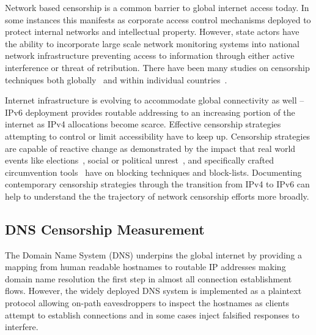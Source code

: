 Network based censorship is a common barrier to global internet access today.
In some instances this manifests as corporate access control mechanisms deployed
to protect internal networks and intellectual property. However,
state actors have the ability to incorporate large scale network monitoring
systems into national network infrastructure preventing access to information
through either active interference or threat of retribution. There
have been many studies on censorship techniques both
globally~\cite{pearce2017global,niaki2020iclab,scott2016satellite,sundara2020censored,filasto2012ooni,pearce2017augur}
and within individual countries~\cite{USESEC21:GFWatch,aryan2013internet,ramesh2020decentralized,yadav2018light,gebhart2017internet,nabi2013anatomy}.

Internet infrastructure is evolving to accommodate global connectivity as well
-- IPv6 deployment provides routable addressing to an increasing portion of the
internet as IPv4 allocations become scarce. Effective censorship strategies
attempting to control or limit accessibility have to keep up.
Censorship strategies are capable of reactive change as demonstrated by
the impact that real world events like elections~\cite{aryan2013internet},
social or political unrest~\cite{shandler2018measuring,padmanabhan2021multi},
and specifically crafted circumvention tools~\cite{beznazwy2020china}
have on blocking techniques and block-lists. Documenting contemporary censorship
strategies through the transition from IPv4 to IPv6 can help to understand the
the trajectory of network censorship efforts more broadly.


\subsection{DNS Censorship Measurement}

\FigDNSCensorship

The Domain Name System (DNS) underpins the global internet by providing a
mapping from human readable hostnames to routable IP addresses making domain name
resolution the first step in almost all connection establishment flows. However,
the widely deployed DNS system is implemented as a plaintext protocol allowing
on-path eavesdroppers to inspect the hostnames as clients attempt to establish
connections and in some cases inject falsified responses to interfere.

